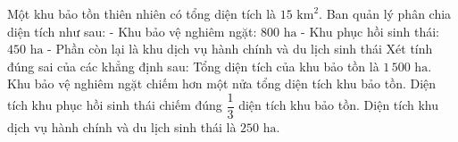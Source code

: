 \begin{ex} %
Một khu bảo tồn thiên nhiên có tổng diện tích là $15\text{ km}^2$. Ban quản lý phân chia diện tích như sau:
- Khu bảo vệ nghiêm ngặt: $800\text{ ha}$
- Khu phục hồi sinh thái: $450\text{ ha}$
- Phần còn lại là khu dịch vụ hành chính và du lịch sinh thái
Xét tính đúng sai của các khẳng định sau:
\choiceTF
{\True Tổng diện tích của khu bảo tồn là $1\,500\text{ ha}$.}
{\True Khu bảo vệ nghiêm ngặt chiếm hơn một nửa tổng diện tích khu bảo tồn.}
{Diện tích khu phục hồi sinh thái chiếm đúng $\dfrac{1}{3}$ diện tích khu bảo tồn.}
{\True Diện tích khu dịch vụ hành chính và du lịch sinh thái là $250\text{ ha}$.}
\end{ex}

